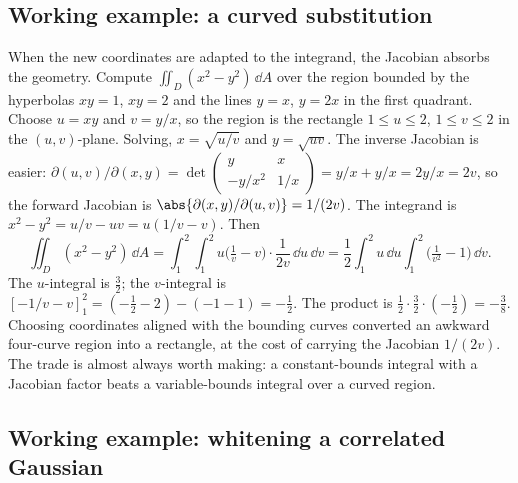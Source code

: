 \subsection{Working example: a curved substitution}

When the new coordinates are adapted to the integrand, the Jacobian
absorbs the geometry. Compute $\iint_{D} (x^{2} - y^{2})\,\dd A$ over
the region bounded by the hyperbolas $xy = 1$, $xy = 2$ and the lines
$y = x$, $y = 2x$ in the first quadrant. Choose $u = xy$ and $v =
y/x$, so the region is the rectangle $1 \leq u \leq 2$, $1 \leq v
\leq 2$ in the $(u, v)$-plane. Solving, $x = \sqrt{u/v}$ and $y =
\sqrt{uv}$. The inverse Jacobian is easier: $\partial(u, v)/
\partial(x, y) = \det\begin{pmatrix} y & x \\ -y/x^{2} & 1/x
\end{pmatrix} = y/x + y/x = 2y/x = 2v$, so the forward Jacobian is
$\abs{\partial(x, y)/\partial(u, v)} = 1/(2v)$. The integrand is
$x^{2} - y^{2} = u/v - uv = u(1/v - v)$. Then
\[
\iint_{D}(x^{2} - y^{2})\,\dd A
= \int_{1}^{2}\!\int_{1}^{2} u\Big(\tfrac{1}{v} - v\Big)\cdot
\frac{1}{2v}\,\dd u\,\dd v
= \frac{1}{2}\int_{1}^{2} u\,\dd u \int_{1}^{2}
\Big(\tfrac{1}{v^{2}} - 1\Big)\,\dd v.
\]
The $u$-integral is $\tfrac{3}{2}$; the $v$-integral is
$[-1/v - v]_{1}^{2} = (-\tfrac{1}{2} - 2) - (-1 - 1) = -\tfrac{1}{2}$.
The product is $\tfrac{1}{2}\cdot\tfrac{3}{2}\cdot(-\tfrac{1}{2}) =
-\tfrac{3}{8}$. Choosing coordinates aligned with the bounding curves
converted an awkward four-curve region into a rectangle, at the cost
of carrying the Jacobian $1/(2v)$. The trade is almost always worth
making: a constant-bounds integral with a Jacobian factor beats a
variable-bounds integral over a curved region.

\subsection{Working example: whitening a correlated Gaussian}

